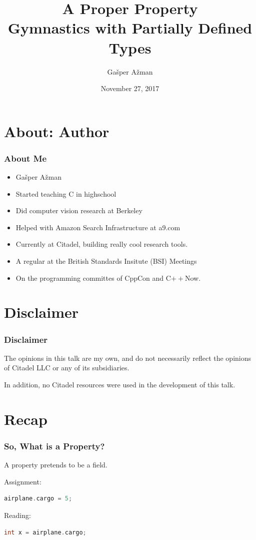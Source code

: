 \documentclass{beamer}
\title{A Proper Property\\
       \cplusplus Gymnastics with Partially Defined Types}
\author{Gašper Ažman}
\date{November 27, 2017}
\newcommand{\CC}{C\nolinebreak\hspace{-.05em}\raisebox{0.4ex}{\resizebox{!}{0.6\baselineskip}{\bf++}}}
\newcommand{\cplusplus}{\protect\CC\xspace}
\newcommand{\nl}{\vspace{\baselineskip}}
\begin{document}
\begin{frame}
  \titlepage
\end{frame}


\section{About: Author}
\begin{frame}
  \frametitle{About Me}
  \begin{itemize}
    \item Gašper Ažman
    \item Started teaching \cplusplus in highschool
    \item Did computer vision research at Berkeley
    \item Helped with Amazon Search Infrastructure at a9.com
    \item Currently at Citadel, building really cool research tools.
    \item A regular at the British Standards Insitute (BSI) Meetings
    \item On the programming committes of CppCon and C$++$Now.
  \end{itemize}
\end{frame}

\section{Disclaimer}

\begin{frame}
  \frametitle{Disclaimer}
  The opinions in this talk are my own, and do not necessarily reflect the
  opinions of Citadel LLC or any of its subsidiaries.\nl
  
  In addition, no Citadel resources were used in the development of this talk.
\end{frame}


\section{Recap}
\begin{frame}[fragile]
  \frametitle{So, What is a Property?}
  A property pretends to be a field.\nl
  
  Assignment:
  \begin{lstlisting}[language=cpp]
    airplane.cargo = 5;
  \end{lstlisting}

  Reading:
  \begin{lstlisting}[language=cpp]
    int x = airplane.cargo;
  \end{lstlisting}
\end{frame}
\end{document}
